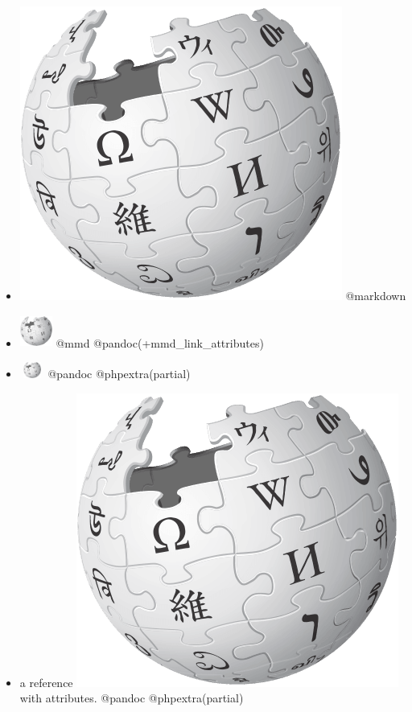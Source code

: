 \documentclass[]{article}
\providecommand{\tightlist}{%
  \setlength{\itemsep}{0pt}\setlength{\parskip}{0pt}}
\begin{document}
\begin{itemize}
\tightlist
\item
  \includegraphics{image.png} @markdown
\item
  \includegraphics[width=0.41667in,height=0.41667in]{image.png} @mmd
  @pandoc(+mmd\_link\_attributes)
\item
  \includegraphics[width=0.31250in,height=0.20833in]{image.png} @pandoc
  @phpextra(partial)
\item
  a reference \includegraphics{image.png} with attributes. @pandoc
  @phpextra(partial)
\end{itemize}
\end{document}

